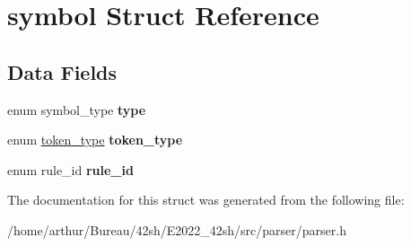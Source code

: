\hypertarget{structsymbol}{}\section{symbol Struct Reference}
\label{structsymbol}
\subsection*{Data Fields}
\begin{DoxyCompactItemize}
\item 
\mbox{\label{structsymbol_ac57220b3939a183c2fc6095b8442fbc4}} 
enum symbol\+\_\+type {\bfseries type}
\item 
\mbox{\label{structsymbol_a78b80c61b3753f8c5a93c5162e83f1c7}} 
enum \hyperlink{token_8h_afe5ef662303b6b710ea6ee1a944bad0d}{token\+\_\+type} {\bfseries token\+\_\+type}
\item 
\mbox{\label{structsymbol_a7fc88fb764d00007bd9536355e1457ca}} 
enum rule\+\_\+id {\bfseries rule\+\_\+id}
\end{DoxyCompactItemize}


The documentation for this struct was generated from the following file\+:\begin{DoxyCompactItemize}
\item 
/home/arthur/\+Bureau/42sh/\+E2022\+\_\+42sh/src/parser/parser.\+h\end{DoxyCompactItemize}
